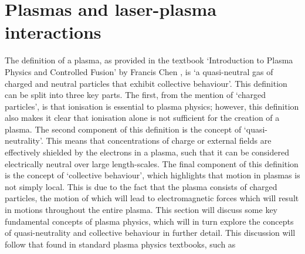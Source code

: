 \section{Plasmas and laser-plasma interactions}
The definition of a plasma, as provided in the textbook `Introduction to  Plasma Physics and Controlled Fusion' by Francis Chen \cite{Chen2016}, is `a quasi-neutral gas of charged and neutral particles that exhibit collective behaviour'. This definition can be split into three key parts. The first, from the mention of `charged particles', is that ionisation is essential to plasma physics; however, this definition also makes it clear that ionisation alone is not sufficient for the creation of a plasma. The second component of this definition is the concept of `quasi-neutrality'. This means that concentrations of charge or external fields are effectively shielded by the electrons in a plasma, such that it can be considered electrically neutral over large length-scales. The final component of this definition is the concept of `collective behaviour', which highlights that motion in plasmas is not simply local. This is due to the fact that the plasma consists of charged particles, the motion of which will lead to electromagnetic forces which will result in motions throughout the entire plasma. This section will discuss some key fundamental concepts of plasma physics, which will in turn explore the concepts of quasi-neutrality and collective behaviour in further detail. This discussion will follow that found in standard plasma physics textbooks, such as \cite{Chen2016, Colvin2013} 


